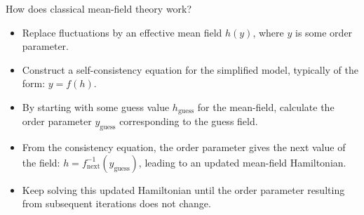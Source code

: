 \documentclass[11pt,aspectratio=169]{beamer}
\begin{document}
\begin{frame}{How does classical mean-field theory work?}
\begin{itemize}[<+->]
	\item Replace fluctuations by an \alert{effective mean field} $h(y)$, where \(y\) is some order parameter.
		\\[10pt]
\item Construct a \alert{self-consistency equation} for the simplified model, typically of the form: $y = f(h)$.
	\\[10pt]
\item By starting with some \alert{guess value \(h_\text{guess}\)} for the mean-field, calculate the order parameter \(y_\text{guess}\) corresponding to the guess field.
	\\[10pt]
\item From the consistency equation, the order parameter gives the next value of the field: \(h = f^{-1}_\text{next}(y_\text{guess})\), leading to an \alert{updated mean-field Hamiltonian}.
	\\[10pt]
\item \alert{Keep solving} this updated Hamiltonian until the order parameter resulting from subsequent iterations does not change.
	\only<5>{\color{brown}\[h=0.059\implies h_\text{next} = \arctan(0.0591) \implies h_\text{next} = \arctan(0.0589) \]}
\end{itemize}
	
\end{frame}
\end{document}

